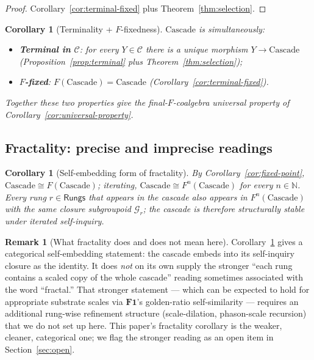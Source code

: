 \documentclass[11pt, a4paper]{amsart}
\newtheorem{corollary}[theorem]{Corollary}
\theoremstyle{definition}
\newtheorem{remark}[theorem]{Remark}
\newcommand{\N}{\mathbb{N}}
\newcommand{\Rungs}{\mathsf{Rungs}}
\newcommand{\catC}{\mathcal{C}}
\newcommand{\Gcal}{\mathcal{G}}
\begin{document}
\begin{proof}
Corollary~\ref{cor:terminal-fixed} plus
Theorem~\ref{thm:selection}.
\end{proof}

\begin{corollary}[Terminality + $F$-fixedness]
\label{cor:min-max}
$\mathrm{Cascade}$ is simultaneously:
\begin{itemize}
\item \textbf{Terminal in $\catC$}: for every $Y \in \catC$
  there is a unique morphism $Y \to \mathrm{Cascade}$
  (Proposition~\ref{prop:terminal} plus
  Theorem~\ref{thm:selection});
\item \textbf{$F$-fixed}: $F(\mathrm{Cascade}) =
  \mathrm{Cascade}$ (Corollary~\ref{cor:terminal-fixed}).
\end{itemize}
Together these two properties give the final-$F$-coalgebra
universal property of Corollary~\ref{cor:universal-property}.
\end{corollary}

\subsection{Fractality: precise and imprecise readings}

\begin{corollary}[Self-embedding form of fractality]
\label{cor:fractality}
By Corollary~\ref{cor:fixed-point}, $\mathrm{Cascade} \cong
F(\mathrm{Cascade})$; iterating, $\mathrm{Cascade} \cong
F^n(\mathrm{Cascade})$ for every $n \in \N$. Every rung
$r \in \Rungs$ that appears in the cascade also appears in
$F^n(\mathrm{Cascade})$ with the same closure subgroupoid
$\Gcal_r$; the cascade is therefore structurally stable under
iterated self-inquiry.
\end{corollary}

\begin{remark}[What fractality does and does not mean here]
\label{rmk:fractality-caveat}
Corollary~\ref{cor:fractality} gives a categorical self-embedding
statement: the cascade embeds into its self-inquiry closure as
the identity. It does \emph{not} on its own supply the stronger
``each rung contains a scaled copy of the whole cascade'' reading
sometimes associated with the word ``fractal.'' That stronger
statement — which can be expected to hold for appropriate
substrate scales via $\mathbf{F1}$'s golden-ratio self-similarity
— requires an additional rung-wise refinement structure
(scale-dilation, phason-scale recursion) that we do not set up
here. This paper's fractality corollary is the weaker, cleaner,
categorical one; we flag the stronger reading as an open item in
Section~\ref{sec:open}.
\end{remark}
\end{document}
